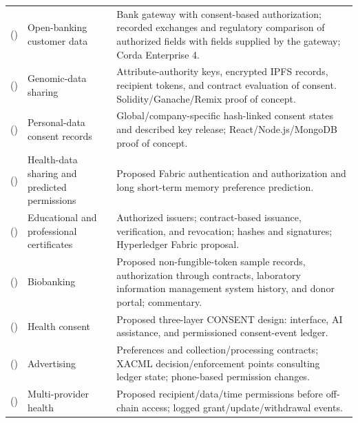 \begin{longtable}{@{}>{\raggedright\arraybackslash}m{}>{\raggedright\arraybackslash}m{}>{\raggedright\arraybackslash}m{}@{}}
\addlinespace[5pt]
\cite{updateGhosh2024Banking} (\citeyear{updateGhosh2024Banking}) & Open-banking customer data & Bank gateway with consent-based authorization; recorded exchanges and regulatory comparison of authorized fields with fields supplied by the gateway; Corda Enterprise 4. \\
\addlinespace[5pt]
\cite{updateRao2024Genomic} (\citeyear{updateRao2024Genomic}) & Genomic-data sharing & Attribute-authority keys, encrypted IPFS records, recipient tokens, and contract evaluation of consent. Solidity/Ganache/Remix proof of concept. \\
\addlinespace[5pt]
\cite{updateAyala2024DataConsent} (\citeyear{updateAyala2024DataConsent}) & Personal-data consent records & Global/company-specific hash-linked consent states and described key release; React/Node.js/MongoDB proof of concept. \\
\addlinespace[5pt]
\cite{updateDeepthika2024ConsentLSTM} (\citeyear{updateDeepthika2024ConsentLSTM}) & Health-data sharing and predicted permissions & Proposed Fabric authentication and authorization and long short-term memory preference prediction. \\
\addlinespace[5pt]
\cite{updateGupta2024CertificatePermission} (\citeyear{updateGupta2024CertificatePermission}) & Educational and professional certificates & Authorized issuers; contract-based issuance, verification, and revocation; hashes and signatures; Hyperledger Fabric proposal. \\
\addlinespace[5pt]
\cite{updateBarnes2025DemonstratedConsent} (\citeyear{updateBarnes2025DemonstratedConsent}) & Biobanking & Proposed non-fungible-token sample records, authorization through contracts, laboratory information management system history, and donor portal; commentary. \\
\addlinespace[5pt]
\cite{updateBonotis2025CONSENT} (\citeyear{updateBonotis2025CONSENT}) & Health consent & Proposed three-layer CONSENT design: interface, AI assistance, and permissioned consent-event ledger. \\
\addlinespace[5pt]
\cite{updateDauden2025RTBConsent} (\citeyear{updateDauden2025RTBConsent}) & Advertising & Preferences and collection/processing contracts; XACML decision/enforcement points consulting ledger state; phone-based permission changes. \\
\addlinespace[5pt]
\cite{updateObodo2025MultiProviderConsent} (\citeyear{updateObodo2025MultiProviderConsent}) & Multi-provider health & Proposed recipient/data/time permissions before off-chain access; logged grant/update/withdrawal events. \\

\end{longtable}
